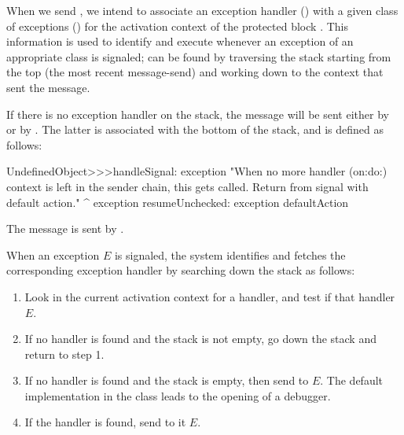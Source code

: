 \documentclass[a4paper,10pt,twoside]{book}
\begin{document}
When we send , we intend to associate an exception handler () with a given class of exceptions () for the activation context of the protected block .
This information is used to identify and execute  whenever an exception of an appropriate class is signaled;  can be found by traversing the stack starting from the top (the most recent message-send) and working down to the context that sent the  message.

If there is no exception handler on the stack, the message  will be sent either by  or by . The latter is associated with the bottom of the stack, and is defined as follows:

\begin{code}{}
UndefinedObject>>>handleSignal: exception
	"When no more handler (on:do:) context is left in the sender chain, this gets called.  Return from signal with default action."
	^ exception resumeUnchecked: exception defaultAction
\end{code}

The message  is sent by . 

When an exception $E$ is signaled, the system identifies and fetches the corresponding exception handler by searching down the stack as follows:

\begin{enumerate}

\item Look in the current activation context for a handler, and test if that handler  $E$.

\item If no handler is found and the stack is not empty, go down the stack and return to step 1.

\item If no handler is found and the stack is empty, then send  to $E$. The default implementation in the  class leads to the opening of a debugger.

\item If the handler is found, send to it  $E$.

\end{enumerate}
\end{document}
